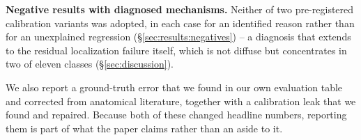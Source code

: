 \textbf{Negative results with diagnosed mechanisms.} Neither of two
pre-registered calibration variants was adopted, in each case for an identified
reason rather than for an unexplained regression
(\S\ref{sec:results:negatives}) -- a diagnosis that extends to the residual
localization failure itself, which is not diffuse but concentrates in two of
eleven classes (\S\ref{sec:discussion}).

We also report a ground-truth error that we found in our own evaluation table
and corrected from anatomical literature, together with a calibration leak that
we found and repaired. Because both of these changed headline numbers,
reporting them is part of what the paper claims rather than an aside to it.
